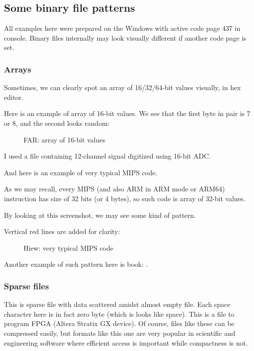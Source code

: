 
\subsection{Some binary file patterns}

All examples here were prepared on the Windows with active code page 437
in console.
Binary files internally may look visually different if another code page is set.

\clearpage
\subsubsection{Arrays}

Sometimes, we can clearly spot an array of 16/32/64-bit values visually, in hex editor.

Here is an example of array of 16-bit values.
We see that the first byte in pair is 7 or 8, and the second looks random:

\begin{figure}[H]
\centering
{}
\caption{FAR: array of 16-bit values}
\end{figure}

I used a file containing 12-channel signal digitized using 16-bit \ac{ADC}.

\clearpage
{}
\par And here is an example of very typical MIPS code.

As we may recall, every MIPS (and also ARM in ARM mode or ARM64) instruction has size of 32 bits (or 4 bytes), 
so such code is array of 32-bit values.

By looking at this screenshot, we may see some kind of pattern.

Vertical red lines are added for clarity:

\begin{figure}[H]
\centering
{}
\caption{Hiew: very typical MIPS code}
\end{figure}

Another example of such pattern here is book: 
.

\clearpage
\subsubsection{Sparse files}

This is sparse file with data scattered amidst almost empty file.
Each space character here is in fact zero byte (which is looks like space).
This is a file to program FPGA (Altera Stratix GX device).
Of course, files like these can be compressed easily, but formats like this one are very popular in scientific and engineering software where efficient access is important while compactness is not.

